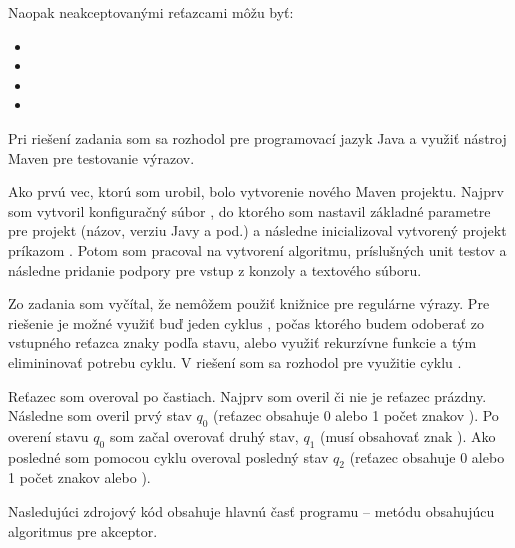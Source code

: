 \documentclass[12pt,a4paper]{article}
\begin{document}
    \noindentfix Naopak neakceptovanými reťazcami môžu byť:
    \begin{itemize}
        \setlength{\parskip}{0pt}
        \setlength{\itemsep}{0pt}
        \item {}
        \item {}
        \item {}
        \item {}
    \end{itemize}

    \noindentfix Pri riešení zadania som sa rozhodol pre programovací jazyk Java a využiť nástroj Maven pre testovanie výrazov.

    \noindentfix Ako prvú vec, ktorú som urobil, bolo vytvorenie nového Maven projektu. Najprv som vytvoril konfiguračný súbor , do ktorého som nastavil základné parametre pre projekt (názov, verziu Javy a pod.) a následne inicializoval vytvorený projekt príkazom . Potom som pracoval na vytvorení algoritmu, príslušných unit testov a následne pridanie podpory pre vstup z konzoly a textového súboru.

    \pagebreak

    \noindentfix Zo zadania som vyčítal, že nemôžem použiť knižnice pre regulárne výrazy. Pre riešenie je možné využiť buď jeden cyklus , počas ktorého budem odoberať zo vstupného reťazca znaky podľa stavu, alebo využiť rekurzívne funkcie a tým elimininovať potrebu cyklu. V riešení som sa rozhodol pre využitie cyklu .

    \noindentfix Reťazec som overoval po častiach. Najprv som overil či nie je reťazec prázdny. Následne som overil prvý stav $q_0$ (reťazec obsahuje 0 alebo 1 počet znakov ). Po overení stavu $q_0$ som začal overovať druhý stav, $q_1$ (musí obsahovať znak ). Ako posledné som pomocou cyklu overoval posledný stav $q_2$ (reťazec obsahuje 0 alebo 1 počet znakov  alebo ).

    \noindentfix Nasledujúci zdrojový kód obsahuje hlavnú časť programu -- metódu obsahujúcu algoritmus pre akceptor. 

    \begin{center}
        
    \end{center}
\end{document}
